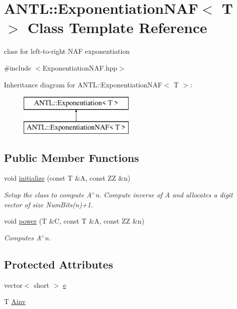 \hypertarget{classANTL_1_1ExponentiationNAF}{\section{A\-N\-T\-L\-:\-:Exponentiation\-N\-A\-F$<$ T $>$ Class Template Reference}
\label{classANTL_1_1ExponentiationNAF}
}


class for left-\/to-\/right N\-A\-F exponentiation  




{\ttfamily \#include $<$Exponentiation\-N\-A\-F.\-hpp$>$}

Inheritance diagram for A\-N\-T\-L\-:\-:Exponentiation\-N\-A\-F$<$ T $>$\-:\begin{figure}[H]
\begin{center}
\leavevmode
\includegraphics[height=2.000000cm]{db/d6c/classANTL_1_1ExponentiationNAF}
\end{center}
\end{figure}
\subsection*{Public Member Functions}
\begin{DoxyCompactItemize}
\item 
void \hyperlink{classANTL_1_1ExponentiationNAF_aa70b6e1083b3936ed0a234998624a188}{initialize} (const T \&A, const Z\-Z \&n)
\begin{DoxyCompactList}\small\item\em Setup the class to compute A$^\wedge$n. Compute inverse of A and allocates a digit vector of size Num\-Bits(n)+1. \end{DoxyCompactList}\item 
void \hyperlink{classANTL_1_1ExponentiationNAF_ae8d97318323ee8b3a888080d75f2cc39}{power} (T \&C, const T \&A, const Z\-Z \&n)
\begin{DoxyCompactList}\small\item\em Computes A$^\wedge$n. \end{DoxyCompactList}\end{DoxyCompactItemize}
\subsection*{Protected Attributes}
\begin{DoxyCompactItemize}
\item 
vector$<$ short $>$ \hyperlink{classANTL_1_1ExponentiationNAF_a9cbe814c668d82453284afc1f662e3e2}{e}
\item 
T \hyperlink{classANTL_1_1ExponentiationNAF_a3daf8a194f65ea69e18882e03e2d9af7}{Ainv}
\end{DoxyCompactItemize}



